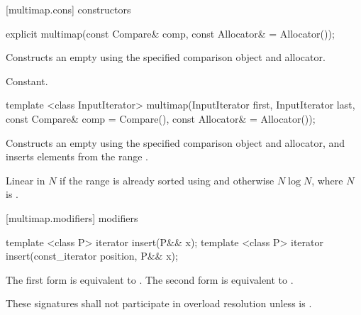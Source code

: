 [multimap.cons]{ constructors}

%
%
\begin{itemdecl}
explicit multimap(const Compare& comp, const Allocator& = Allocator());
\end{itemdecl}

\begin{itemdescr}
\pnum
\effects
Constructs an empty
using the specified comparison object and allocator.

\pnum
\complexity
Constant.
\end{itemdescr}

%
%
\begin{itemdecl}
template <class InputIterator>
  multimap(InputIterator first, InputIterator last,
           const Compare& comp = Compare(),
           const Allocator& = Allocator());
\end{itemdecl}

\begin{itemdescr}
\pnum
\effects
Constructs an empty
using the specified comparison object and allocator,
and inserts elements from the range
.

\pnum
\complexity
Linear in $N$ if the range
is already sorted using 
and otherwise $N \log{N}$,
where $N$ is
.
\end{itemdescr}

[multimap.modifiers]{ modifiers}

%
%
\begin{itemdecl}
template <class P> iterator insert(P&& x);
template <class P> iterator insert(const_iterator position, P&& x);
\end{itemdecl}

\begin{itemdescr}
\pnum
\effects
The first form is equivalent to 
. The second form is
equivalent to .

\pnum
\remarks
These signatures shall not participate in overload resolution
unless  is
.
\end{itemdescr}

